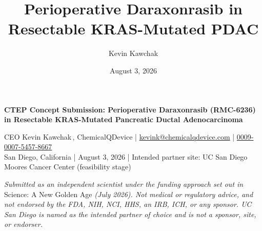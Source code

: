 \documentclass[11pt]{article}
\title{Perioperative Daraxonrasib in Resectable KRAS-Mutated PDAC}
\author{Kevin Kawchak}
\date{August 3, 2026}
\begin{document}
\thispagestyle{plain}

{\raggedright\large\bfseries\color{protoblue} CTEP Concept Submission:
Perioperative Daraxonrasib (RMC-6236) in Resectable KRAS-Mutated Pancreatic
Ductal Adenocarcinoma\par}

\vspace{0.2em}


\vspace{0.1em}
\apprule{0.8pt}

\noindent\small CEO Kevin Kawchak\,,
ChemicalQDevice \;|\;
\href{mailto:kevink@chemicalqdevice.com}{kevink@chemicalqdevice.com} \;|\;
\href{https://orcid.org/0009-0007-5457-8667}{0009-0007-5457-8667}\\
San Diego, California \;|\; August 3, 2026 \;|\; Intended partner site: UC San
Diego Moores Cancer Center (feasibility stage)\normalsize\par

\vspace{0.05em}

\noindent\footnotesize\textit{Submitted as an independent scientist under the
funding approach set out in} Science: A New Golden Age \textit{(July 2026). Not
medical or regulatory advice, and not endorsed by the FDA, NIH, NCI, HHS, an
IRB, ICH, or any sponsor. UC San Diego is named as the intended partner of
choice and is not a sponsor, site, or endorser.}\normalsize\par

\vspace{-0.1em}
\apprule{0.4pt}







\end{document}
